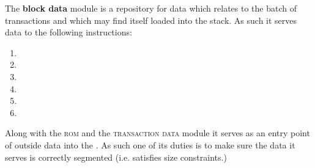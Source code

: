 The \textbf{block data} module \btcMod{} is a repository for data which relates to the batch of transactions and which may find itself loaded into the stack. As such it serves data to the following instructions:
\begin{multicols}{3}
\begin{enumerate}
	\item {}
	\item {}
	\item {}
	\item {}
	\item {}
	\item {}
\end{enumerate}
\end{multicols}
Along with the \textsc{rom} and the \textsc{transaction data} module it serves as an entry point of outside data into the \zkEvm{}. As such one of its duties is to make sure the data it serves is correctly segmented (i.e. satisfies size constraints.)
